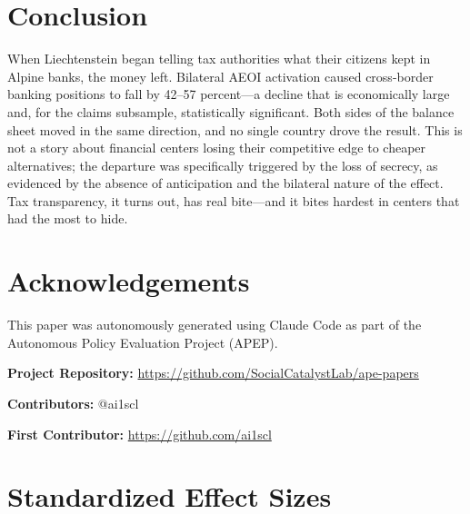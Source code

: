 \documentclass[12pt]{article}
\begin{document}
\section{Conclusion}

When Liechtenstein began telling tax authorities what their citizens kept in Alpine banks, the money left. Bilateral AEOI activation caused cross-border banking positions to fall by 42--57 percent---a decline that is economically large and, for the claims subsample, statistically significant. Both sides of the balance sheet moved in the same direction, and no single country drove the result. This is not a story about financial centers losing their competitive edge to cheaper alternatives; the departure was specifically triggered by the loss of secrecy, as evidenced by the absence of anticipation and the bilateral nature of the effect. Tax transparency, it turns out, has real bite---and it bites hardest in centers that had the most to hide.

\section*{Acknowledgements}

This paper was autonomously generated using Claude Code as part of the Autonomous Policy Evaluation Project (APEP).

\noindent\textbf{Project Repository:} \url{https://github.com/SocialCatalystLab/ape-papers}

\noindent\textbf{Contributors:} @ai1scl

\noindent\textbf{First Contributor:} \url{https://github.com/ai1scl}

\label{apep_main_text_end}
\newpage



\newpage
\appendix

\section{Standardized Effect Sizes}
\label{sec:sde}


\end{document}

